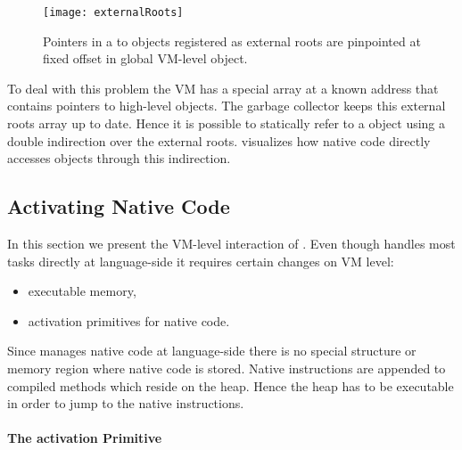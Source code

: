 \begin{figure}[h]
	\centering
	\texttt{[image: externalRoots]}
	\caption[\NBFFI External Roots]{Pointers in a  to objects registered as external roots are pinpointed at fixed offset in global VM-level object.}
\end{figure}

To deal with this problem the VM has a special array at a known address that contains pointers to high-level objects.
The garbage collector keeps this external roots array up to date.
Hence it is possible to statically refer to a \PH object using a double indirection over the external roots.
 visualizes how native code directly accesses \PH objects through this indirection.


\subsection{Activating Native Code}

In this section we present the VM-level interaction of \NB.
Even though \NB handles most tasks directly at language-side it requires certain changes on VM level:
\begin{itemize}
	\item executable memory,
	\item activation primitives for native code.
\end{itemize}
%
Since \NB manages native code at language-side there is no special structure or memory region where native code is stored.
Native instructions are appended to compiled methods which reside on the heap.
Hence the heap has to be executable in order to jump to the native instructions.


\paragraph{The \NB activation Primitive}

